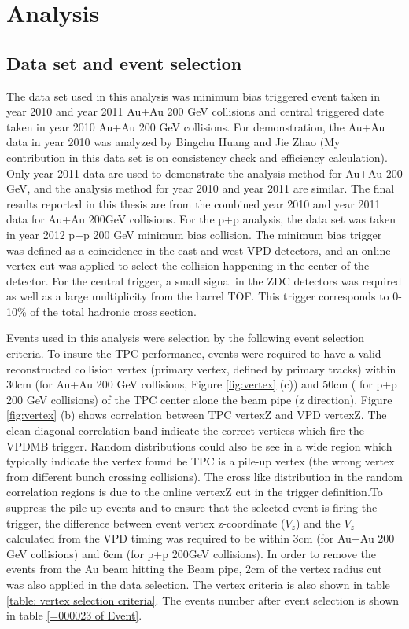 %

\chapter{Analysis}


\section{Data set and event selection}

The data set used in this analysis was minimum bias triggered event
taken in year 2010 and year 2011 Au+Au 200 GeV collisions and central
triggered date taken in year 2010 Au+Au 200 GeV collisions. For demonstration,
the Au+Au data in year 2010 was analyzed by Bingchu Huang and Jie
Zhao \cite{Zhao:2013vn,Huang:2011zl} (My contribution in this data
set is on consistency check and efficiency calculation). Only year
2011 data are used to demonstrate the analysis method for Au+Au 200
GeV, and the analysis method for year 2010 and year 2011 are similar.
The final results reported in this thesis are from the combined year
2010 and year 2011 data for Au+Au 200GeV collisions. For the p+p analysis,
the data set was taken in year 2012 p+p 200 GeV minimum bias collision.
The minimum bias trigger was defined as a coincidence in the east
and west VPD detectors, and an online vertex cut was applied to select
the collision happening in the center of the detector. For the central
trigger, a small signal in the ZDC detectors was required as well
as a large multiplicity from the barrel TOF. This trigger corresponds
to 0-10\% of the total hadronic cross section.

Events used in this analysis were selection by the following event
selection criteria. To insure the TPC performance, events were required
to have a valid reconstructed collision vertex (primary vertex, defined
by primary tracks) within 30cm (for Au+Au 200 GeV collisions, Figure
\ref{fig:vertex} (c)) and 50cm ( for p+p 200 GeV collisions) of the
TPC center alone the beam pipe (z direction). Figure \ref{fig:vertex}
(b) shows correlation between TPC vertexZ and VPD vertexZ. The clean
diagonal correlation band indicate the correct vertices which fire
the VPDMB trigger. Random distributions could also be see in a wide
region which typically indicate the vertex found be TPC is a pile-up
vertex (the wrong vertex from different bunch crossing collisions).
The cross like distribution in the random correlation regions is due
to the online vertexZ cut in the trigger definition.To suppress the
pile up events and to ensure that the selected event is firing the
trigger, the difference between event vertex z-coordinate ($V_{z}$)
and the $V_{z}$ calculated from the VPD timing was required to be
within 3cm (for Au+Au 200 GeV collisions) and 6cm (for p+p 200GeV
collisions). In order to remove the events from the Au beam hitting
the Beam pipe, 2cm of the vertex radius cut was also applied in the
data selection. The vertex criteria is also shown in table \ref{table: vertex selection criteria}.
The events number after event selection is shown in table \ref{=000023 of Event}.

